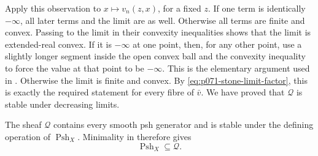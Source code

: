 Apply this observation to \(x\mapsto v_n(z,x)\), for a fixed \(z\).  If one
term is identically \(-\infty\), all later terms and the limit are as well.
Otherwise all terms are finite and convex.  Passing to the limit in their
convexity inequalities shows that the limit is extended-real convex.  If
it is \(-\infty\) at one point, then, for any other point, use a slightly
longer segment inside the open convex ball and the convexity inequality to
force the value at that point to be \(-\infty\).  This is the elementary
argument used in \cite[Proposition~8.3.2]{CLD25}.  Otherwise the limit is
finite and convex.  By \eqref{eq:p071-stone-limit-factor}, this is exactly
the required statement for every fibre of \(\bar v\).  We have proved that
\(\mathscr Q\) is stable under decreasing limits.

The sheaf \(\mathscr Q\) contains every smooth psh generator and is stable
under the defining operation of \(\operatorname{Psh}_X\).  Minimality in
\cite[Definition~8.1.1]{CLD25} therefore gives
\begin{equation}
\label{eq:p071-stone-minimality}
                         \operatorname{Psh}_X\subseteq\mathscr Q.
\end{equation}

